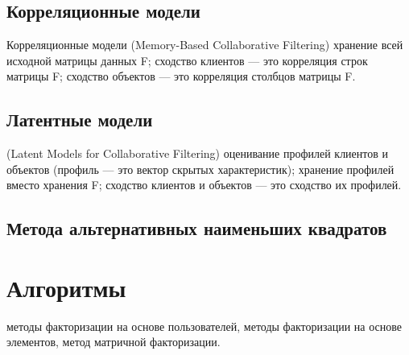 \documentclass[bachelor, och, referat]{shiza}
\begin{document}
\subsection{Корреляционные модели}
Корреляционные модели
(Memory-Based Collaborative Filtering)
хранение всей исходной матрицы данных F;
сходство клиентов — это корреляция строк матрицы F;
сходство объектов — это корреляция столбцов матрицы F.

\subsection{Латентные модели}
(Latent Models for Collaborative Filtering)
оценивание профилей клиентов и объектов
(профиль — это вектор скрытых характеристик);
хранение профилей вместо хранения F;
сходство клиентов и объектов — это сходство их профилей.

\subsection{Метода альтернативных наименьших квадратов}


\section{Алгоритмы}

методы факторизации на основе пользователей, 
методы факторизации на основе элементов, 
метод матричной факторизации.
\end{document}
